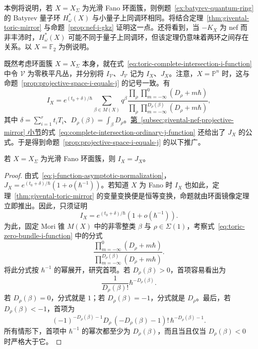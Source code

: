 \begin{example}\label{ex:toric-fano-and-hirzebruch-quantum-ring}
本例将说明，若 $X=X_\Sigma$ 为光滑 Fano 环面簇，则例题~\ref{ex:batyrev-quantum-ring} 的 Batyrev 量子环 $H_\omega^*(X)$ 与小量子上同调环相同。将结合定理~\ref{thm:givental-toric-mirror} 与命题~\ref{prop:nef-i-gkz} 证明这一点。还将看到，当 $-K_X$ 为 nef 而非丰沛时，$H_\omega^*(X)$ 可能不同于量子上同调环，但该定理仍意味着两环之间存在关系。以 $X=\mathbb F_2$ 为例说明。

既然考虑环面簇 $X=X_\Sigma$ 本身，就在式~\eqref{eq:toric-complete-intersection-i-function} 中令 $\mathcal V$ 为零秩平凡丛，并分别将 $I_{\mathcal V}$、$J_{\mathcal V}$ 记为 $I_X$、$J_X$。注意，$X=\mathbb P^n$ 时，这与命题~\ref{prop:projective-space-i-equals-j} 的记号一致。有
\begin{equation}\label{eq:toric-zero-bundle-i-function}
I_X=e^{(t_0+\delta)/\hbar}\sum_{\beta\in M(X)}q^\beta
\frac{\prod_\rho\prod_{m=-\infty}^0(D_\rho+m\hbar)}{\prod_\rho\prod_{m=-\infty}^{D_\rho(\beta)}(D_\rho+m\hbar)},
\end{equation}
其中 $\delta=\sum_{i=1}^rt_iT_i$、$D_\rho(\beta)=\int_\beta D_\rho$。\hyperref[subsec:givental-nef-projective-mirror]{第~\ref*{subsec:givental-nef-projective-mirror} 小节}的式~\eqref{eq:complete-intersection-ordinary-j-function} 还给出了 $J_X$ 的公式。于是得到命题~\ref{prop:projective-space-i-equals-j} 的以下推广。
\begin{proposition}\label{prop:toric-fano-i-equals-j}
若 $X=X_\Sigma$ 为光滑 Fano 环面簇，则 $I_X=J_X$。
\end{proposition}
\begin{proof}
由式~\eqref{eq:j-function-asymptotic-normalization}，$J_X=e^{(t_0+\delta)/\hbar}(1+o(\hbar^{-1}))$。若知道 $X$ 为 Fano 时 $I_X$ 也如此，定理~\ref{thm:givental-toric-mirror} 的变量变换便是恒等变换，命题就由环面镜像定理立即推出。因此，只须证明
\begin{equation}\label{eq:toric-fano-i-normalization}
I_X=e^{(t_0+\delta)/\hbar}(1+o(\hbar^{-1})).
\end{equation}
为此，固定 Mori 锥 $M(X)$ 中的非零整类 $\beta$ 与 $\rho\in\Sigma(1)$，考察式~\eqref{eq:toric-zero-bundle-i-function} 中的分式
\[
\frac{\prod_{m=-\infty}^0(D_\rho+m\hbar)}{\prod_{m=-\infty}^{D_\rho(\beta)}(D_\rho+m\hbar)}.
\]
将此分式按 $\hbar^{-1}$ 的幂展开，研究首项。若 $D_\rho(\beta)>0$，首项容易看出为
\[
\frac1{D_\rho(\beta)!}\hbar^{-D_\rho(\beta)}.
\]
若 $D_\rho(\beta)=0$，分式就是 $1$；若 $D_\rho(\beta)=-1$，分式就是 $D_\rho$。最后，若 $D_\rho(\beta)<-1$，首项为
\[
(-1)^{-D_\rho(\beta)-1}D_\rho\,(-D_\rho(\beta)-1)!\,\hbar^{-D_\rho(\beta)-1}.
\]
所有情形下，首项中 $\hbar^{-1}$ 的幂次都至少为 $D_\rho(\beta)$，而且当且仅当 $D_\rho(\beta)<0$ 时严格大于它。


\end{proof}
\end{example}
